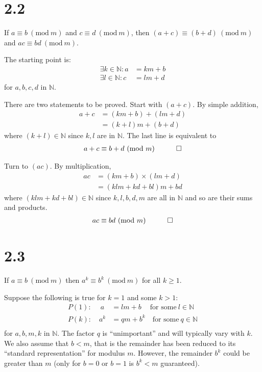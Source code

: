 \documentclass[12pt]{article}
\newcommand{\modulo}[1]{~(\mathrm{mod}~#1)}
\begin{document}
\clearpage
\section*{2.2}
\begin{question}
If $a\equiv b\modulo{m}$ and $c\equiv d\modulo{m}$, then $(a+c)\equiv (b+d)\modulo{m}$ and $ac\equiv bd\modulo{m}$.
\end{question}

The starting point is:
\begin{align*}
\exists k\in\mathbb{N}: a & = km + b \\
\exists l\in\mathbb{N}: c & = lm + d
\end{align*}
for $a,b,c,d$ in $\mathbb{N}$. 

There are two statements to be proved. Start with $(a+c)$. By simple addition,
\begin{align*}
a + c & = (km + b) + (lm + d) \\
  & = (k+l)m + (b+d)
\end{align*}
where $(k+l)\in\mathbb{N}$ since $k,l$ are in $\mathbb{N}$. 
The last line is equivalent to
\begin{align*}
a+c\equiv b+d\modulo{m} \quad \qed
\end{align*}

Turn to $(ac)$. By multiplication,
\begin{align*}
a c & = (km + b) \times (lm + d) \\
  & = (klm+kd+bl)m + bd
\end{align*}
where $(klm+kd+bl)\in\mathbb{N}$ since $k,l,b,d,m$ are all in $\mathbb{N}$ and so are their sums and products. 
\begin{align*}
ac\equiv bd\modulo{m} \quad \qed
\end{align*}



\clearpage
\section*{2.3}
\begin{question}
If $a\equiv b\modulo{m}$ then $a^{k}\equiv b^{k}\modulo{m}$ for all $k\geq1$.
\end{question}

Suppose the following is true for $k=1$ and some $k>1$:
\begin{align*}
P(1):\quad~ a & = lm + b \quad~\text{for some}~l\in\mathbb{N}\\
P(k):\quad a^{k} & = qm + b^{k} \quad\text{for some}~q\in\mathbb{N}\\
\end{align*}
for $a,b,m,k$ in $\mathbb{N}$. The factor $q$ is ``unimportant'' and will typically vary with $k$. We also assume that $b<m$, that is the remainder has been reduced to its ``standard representation'' for modulus $m$. However, the remainder $b^{k}$ could be greater than $m$ (only for $b=0$ or $b=1$ is $b^{k}<m$ guaranteed). 
\end{document}
